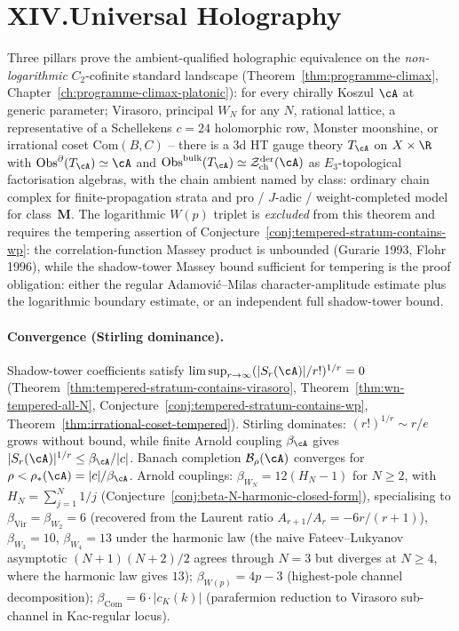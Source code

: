 \section*{XIV.\quad Universal Holography}

\noindent
Three pillars prove the ambient-qualified holographic equivalence
on the \emph{non-logarithmic} $C_2$-cofinite standard landscape
(Theorem~\ref{thm:programme-climax},
Chapter~\ref{ch:programme-climax-platonic}): for every chirally
Koszul $\cA$ at generic parameter; Virasoro, principal $W_N$
for any $N$, rational lattice, a representative of a Schellekens
$c = 24$ holomorphic row, Monster moonshine, or irrational coset
$\mathrm{Com}(B, C)$ --
there is a 3d HT gauge theory $T_\cA$ on $X \times \R$
with $\mathrm{Obs}^\partial(T_\cA) \simeq \cA$ and
$\mathrm{Obs}^{\mathrm{bulk}}(T_\cA) \simeq
\cZ^{\mathrm{der}}_{\mathrm{ch}}(\cA)$ as $E_3$-topological
factorisation algebras, with the chain ambient named by class:
ordinary chain complex for finite-propagation strata and
pro / $J$-adic / weight-completed model for class~$\mathbf M$.
The logarithmic
$W(p)$ triplet is \emph{excluded} from this theorem
and requires the tempering assertion of
Conjecture~\ref{conj:tempered-stratum-contains-wp}: the
correlation-function Massey product is unbounded
(Gurarie 1993, Flohr 1996), while the shadow-tower Massey bound
sufficient for tempering is the proof obligation: either the regular
Adamovi\'c--Milas character-amplitude estimate plus the logarithmic
boundary estimate, or an independent full shadow-tower bound.

\paragraph{Convergence (Stirling dominance).}
Shadow-tower coefficients satisfy
$\limsup_{r \to \infty}(|S_r(\cA)|/r!)^{1/r} = 0$
(Theorem~\ref{thm:tempered-stratum-contains-virasoro},
Theorem~\ref{thm:wn-tempered-all-N},
Conjecture~\ref{conj:tempered-stratum-contains-wp},
Theorem~\ref{thm:irrational-coset-tempered}). Stirling dominates:
$(r!)^{1/r} \sim r/e$ grows without bound, while finite Arnold
coupling $\beta_\cA$ gives $|S_r(\cA)|^{1/r} \le \beta_\cA/|c|$.
Banach completion $\mathcal{B}_\rho(\cA)$ converges for
$\rho < \rho_*(\cA) = |c|/\beta_\cA$. Arnold couplings:
$\beta_{W_N} = 12(H_N - 1)$ for $N \ge 2$, with
$H_N = \sum_{j=1}^{N} 1/j$
(Conjecture~\ref{conj:beta-N-harmonic-closed-form}),
specialising to $\beta_{\mathrm{Vir}} = \beta_{W_2} = 6$
(recovered from the Laurent ratio
$A_{r+1}/A_r = -6r/(r+1)$), $\beta_{W_3} = 10$,
$\beta_{W_4} = 13$ under the harmonic law (the naive
Fateev--Lukyanov asymptotic
$(N+1)(N+2)/2$ agrees through $N = 3$ but diverges at $N \ge 4$,
where the harmonic law gives $13$);
$\beta_{W(p)} = 4p - 3$ (highest-pole channel decomposition);
$\beta_{\mathrm{Com}} = 6 \cdot |c_K(k)|$ (parafermion reduction
to Virasoro sub-channel in Kac-regular locus).

